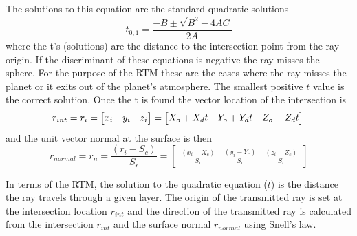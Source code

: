 The solutions to this equation are the standard quadratic solutions
\begin{equation}
t_{0,1} = \frac{-B\pm\sqrt{B^2-4AC}}{2A}
\end{equation}
where the t's (solutions) are the distance to the intersection point from the ray origin. If the discriminant of these equations is negative the ray misses the sphere. For the purpose of the RTM these are the cases where the ray misses the planet or it exits out of the planet's atmosphere. The smallest positive $t$ value is the correct solution. Once the t is found the vector location of the intersection is
\begin{equation}
r_{int} = r_i = \left[ \begin{matrix} x_i&y_i&z_i \end{matrix}\right] = \left[ \begin{matrix} X_o + X_dt&Y_o + Y_dt&Z_o + Z_dt \end{matrix}\right]\\
\end{equation}
and the unit vector normal at the surface is then
\begin{equation}
r_{normal} = r_n = \frac{(r_i-S_c)}{S_r} =\left[ \begin{matrix} \frac{(x_i-X_c)}{S_r} &\frac{(y_i-Y_c)}{S_r} & \frac{(z_i-Z_c)}{S_r} \end{matrix}\right]
\end{equation}

In terms of the RTM, the solution to the quadratic equation ($t$) is the distance the ray travels through a given layer. The origin of the transmitted ray is set at the intersection location $r_{int}$ and the direction of the transmitted ray is calculated from the intersection $r_{int}$ and the surface normal $r_{normal}$ using Snell's law.


